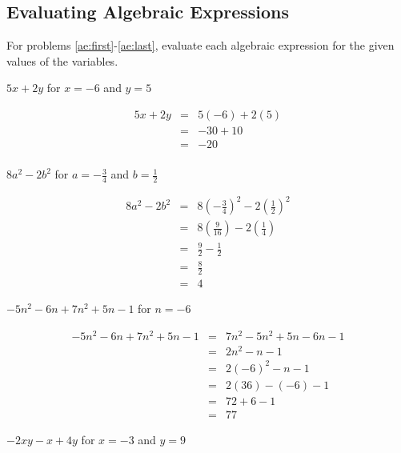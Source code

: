 \documentclass[fleqn,addpoints]{exam}
\begin{document}
\begin{questions}
\subsection{Evaluating Algebraic Expressions}


For problems \ref{ae:first}-\ref{ae:last}, evaluate each algebraic expression for the given values of the variables.

\question[5] \label{ae:first}
\( 5x + 2y \) for \( x = -6 \) and \( y = 5 \)
\begin{solution}[3 cm]
  \begin{eqnarray*}
    5x + 2y & = & 5(-6) + 2(5)    \\
      & = & -30 + 10  \\
      & = & -20 \\
  \end{eqnarray*}
\end{solution}


\question[5]
\( 8a^2 - 2b^2 \) for \( \displaystyle a = -\frac{3}{4} \) and \( \displaystyle b = \frac{1}{2} \)

\begin{solution}[3 cm]
  \begin{eqnarray*}
    8a^2 -2b^2  & = & 8(-\frac{3}{4})^2 - 2(\frac{1}{2})^2    \\
      & = & 8(\frac{9}{16}) - 2(\frac{1}{4})  \\
      & = & \frac{9}{2} - \frac{1}{2} \\
      & = & \frac{8}{2} \\
      & = & 4
  \end{eqnarray*}
\end{solution}

\question[5]
\( -5n^2 - 6n + 7n^2 + 5n - 1 \) for \( n = -6 \)

\begin{solution}[3 cm]
  \begin{eqnarray*}
    -5n^2 - 6n + 7n^2 + 5n - 1  & = & 7n^2 - 5n^2 + 5n - 6n - 1 \\
      & = & 2n^2 - n - 1 \\
      & = & 2(-6)^2 - n - 1 \\
      & = & 2(36) - (-6) - 1 \\
      & = & 72 + 6 - 1 \\
      & = & 77
  \end{eqnarray*}
\end{solution}

\question[5]
\( -2xy - x + 4y \) for \( x = -3 \) and \( y = 9 \)


\end{questions}
\end{document}
